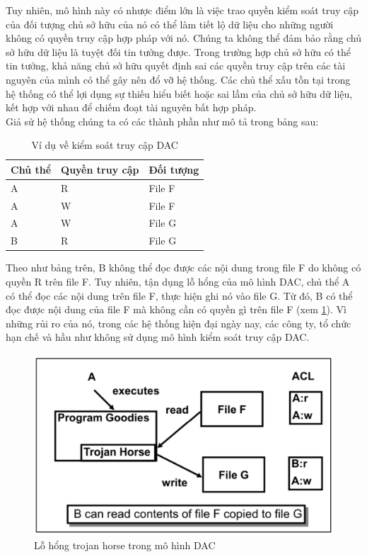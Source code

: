 Tuy nhiên, mô hình này có nhược điểm lớn là việc trao quyền kiểm soát truy cập
của đối tượng chủ sở hữu của nó có thể làm tiết lộ dữ liệu cho những người không có
quyền truy cập hợp pháp với nó. Chúng ta không thể đảm bảo rằng chủ sở hữu dữ liệu
là tuyệt đối tin tưởng được. Trong trường hợp chủ sở hữu có thể tin tưởng, khả năng chủ
sở hữu quyết định sai các quyền truy cập trên các tài nguyên của mình có thể gây nên đổ
vỡ hệ thống. Các chủ thể xấu tồn tại trong hệ thống có thể lợi dụng sự thiếu hiểu biết hoặc sai lầm của chủ sở hữu dữ liệu, kết hợp với nhau để chiếm đoạt tài nguyên bất hợp
pháp. \\

Giả sử hệ thống chúng ta có các thành phần như mô tả trong bảng sau: \\

\begin{table}[ht]
    \centering
    \caption{Ví dụ về kiểm soát truy cập DAC}
    \label{tab:chap2-dac-example}
    \begin{tabular}{| p{} | p{} | p{} |}
        \hline
        \textbf{Chủ thể} & \textbf{Quyền truy cập} & \textbf{Đối tượng} \\
        \hline
        A & R & File F \\
        \hline
        A & W & File F \\
        \hline
        A & W & File G \\
        \hline
        B & R & File G \\
        \hline
    \end{tabular}
\end{table}

Theo như bảng trên, B không thể đọc được các nội dung trong file F do không có
quyền R trên file F. Tuy nhiên, tận dụng lỗ hổng của mô hình DAC, chủ thể A có thể
đọc các nội dung trên file F, thực hiện ghi nó vào file G. Từ đó, B có thể đọc được nội
dung của file F mà không cần có quyền gì trên file F (xem \ref{fig:chap2-troyjan-dac}). Vì những rủi ro của nó, trong các hệ thống hiện đại ngày nay, các công ty, tổ chức hạn chế và hầu như không sử dụng mô hình kiểm soát truy cập DAC. 
\begin{figure}
    \centering
    \includegraphics[scale=0.5]{graphics/chapter-2/chap2-troyjan-dac.png}
    \caption{Lỗ hổng trojan horse trong mô hình DAC \cite{sandhu1996role}}
    \label{fig:chap2-troyjan-dac}
\end{figure}
